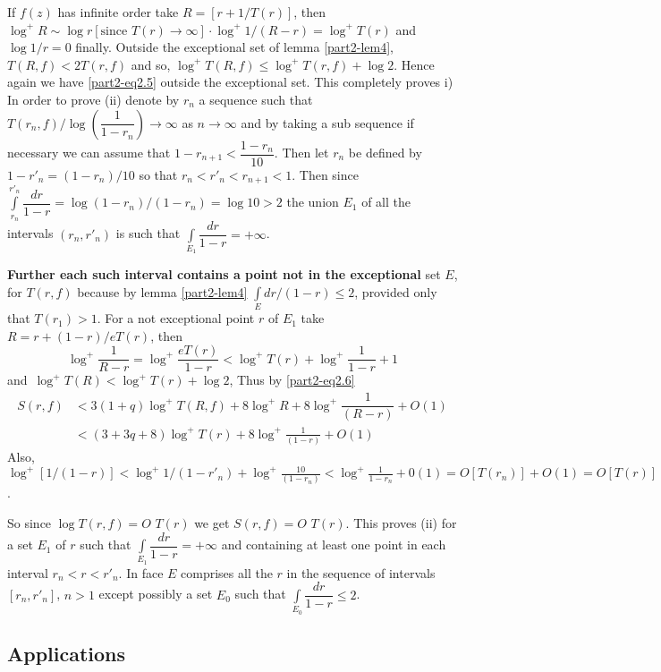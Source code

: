 If $f(z)$ has infinite order take $R=[r+1/T(r)]$, then $\log^{+}R\sim
\log r[\text{since } T(r)\to \infty]\cdot
\log^{+}1/(R-r)=\log^{+}T(r)$ and $\log 1/r=0$ finally. Outside the
exceptional set of lemma \ref{part2-lem4}, $T(R,f)<2T(r,f)$ and so,
$\log^{+}T(R,f)\leq \log^{+}T(r,f)+\log 2$. Hence again we have
\eqref{part2-eq2.5} outside the exceptional set. This completely
proves i) In order to prove (ii) denote by $r_{n}$ a sequence such
that $T(r_{n},f)/\log\left(\dfrac{1}{1-r_{n}}\right)\to \infty$ as
$n\to \infty$ and by taking a sub sequence if necessary we can assume
that $1-r_{n+1}<\dfrac{1-r_{n}}{10}$. Then let $r_{n}$ be defined by
$1-r'_{n}=(1-r_{n})/10$ so that $r_{n}<r'_{n}<r_{n+1}<1$. Then since
$\int\limits^{r'_{n}}_{r_{n}}\dfrac{dr}{1-r}=\log
(1-r_{n})/(1-r_{n})=\log 10>2$ the union $E_{1}$ of all the intervals
$(r_{n},r'_{n})$ is such that
$\int\limits_{E_{1}}\dfrac{dr}{1-r}=+\infty$.

{\bf Further each such interval contains a point not in the
  exceptional} set $E$, for $T(r,f)$ because by lemma \ref{part2-lem4}
$\int\limits_{E}dr/(1-r)\leq 2$, provided only that $T(r_{1})>1$. For
a not exceptional point $r$ of $E_{1}$ take $R=r+(1-r)/eT(r)$, then 
$$
\log^{+}\frac{1}{R-r}=\log^{+}\frac{eT(r)}{1-r}<\log^{+}T(r)+\log^{+}\frac{1}{1-r}+1 
$$
and\pageoriginale\ $\log^{+}T(R)<\log^{+}T(r)+\log 2$, Thus by
\eqref{part2-eq2.6} 
\begin{align*}
S(r,f)&<3(1+q)\log^{+}T(R,f)+8\log^{+}R+8\log^{+}\dfrac{1}{(R-r)}+O(1)\\
&<(3+3q+8)\log^{+}T(r)+8\log^{+}\frac{1}{(1-r)}+O(1)
\end{align*}
Also,
$\log^{+}[1/(1-r)]<\log^{+}1/(1-r'_{n})+\log^{+}
\frac{10}{(1-r_{n})}<\log^{+}\frac{1}{1-r_{n}}+0(1)
=O[T(r_{n})]+O(1)=O[T(r)]$.  

So since $\log T(r,f)=O$ $T(r)$ we get $S(r,f)=O$ $T(r)$. This proves
(ii) for a set $E_{1}$ of $r$ such that
$\int\limits_{E_{1}}\dfrac{dr}{1-r}=+\infty$ and containing at least
one point in each interval $r_{n}<r<r'_{n}$. In face $E$ comprises all
the $r$ in the sequence of intervals $[r_{n},r'_{n}]$, $n>1$ except
possibly a set $E_{0}$ such that
$\int\limits_{E_{0}}\dfrac{dr}{1-r}\leq 2$.

\subsection{Applications}\label{part2-sec2.4}\pageoriginale

